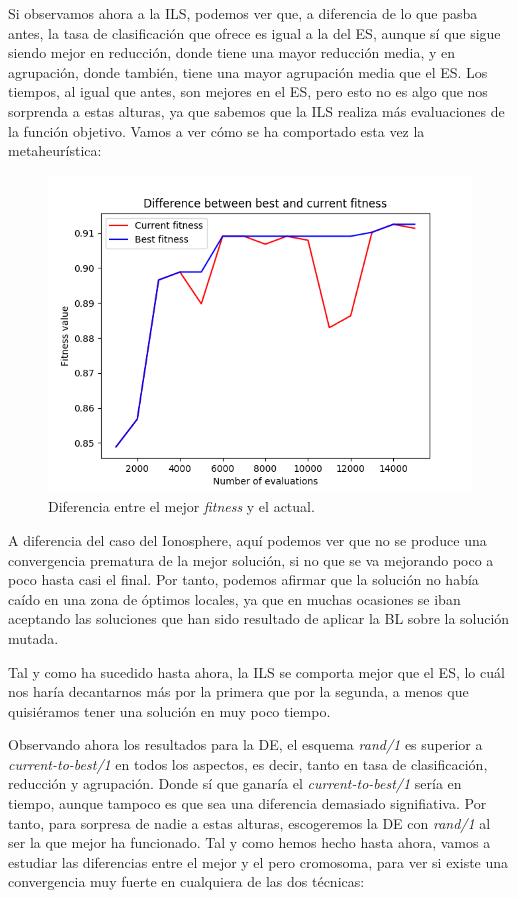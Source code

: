 \documentclass[11pt,a4paper]{article}
\begin{document}
Si observamos ahora a la ILS, podemos ver que, a diferencia de lo que pasba antes, la tasa de clasificación que ofrece es igual
a la del ES, aunque sí que sigue siendo mejor en reducción, donde tiene una mayor reducción media, y en agrupación, donde también,
tiene una mayor agrupación media que el ES. Los tiempos, al igual que antes, son mejores en el ES, pero esto no es algo que nos
sorprenda a estas alturas, ya que sabemos que la ILS realiza más evaluaciones de la función objetivo. Vamos a ver cómo
se ha comportado esta vez la metaheurística:

\begin{figure}[H]
\centering
\includegraphics[scale=0.4]{img/texture-ils.png}
\caption{Diferencia entre el mejor \textit{fitness} y el actual.}
\end{figure}

A diferencia del caso del Ionosphere, aquí podemos ver que no se produce una convergencia prematura de la mejor solución, si no que
se va mejorando poco a poco hasta casi el final. Por tanto, podemos afirmar que la solución no había caído en una zona de óptimos
locales, ya que en muchas ocasiones se iban aceptando las soluciones que han sido resultado de aplicar la BL sobre la solución
mutada.

Tal y como ha sucedido hasta ahora, la ILS se comporta mejor que el ES, lo cuál nos haría decantarnos más por la primera que por
la segunda, a menos que quisiéramos tener una solución en muy poco tiempo.

Observando ahora los resultados para la DE, el esquema \textit{rand/1} es superior a \textit{current-to-best/1} en todos los
aspectos, es decir, tanto en tasa de clasificación, reducción y agrupación. Donde sí que ganaría el \textit{current-to-best/1}
sería en tiempo, aunque tampoco es que sea una diferencia demasiado signifiativa. Por tanto, para sorpresa de nadie a estas alturas,
escogeremos la DE con \textit{rand/1} al ser la que mejor ha funcionado. Tal y como hemos hecho hasta ahora, vamos a estudiar
las diferencias entre el mejor y el pero cromosoma, para ver si existe una convergencia muy fuerte en cualquiera de las dos técnicas:
\end{document}
